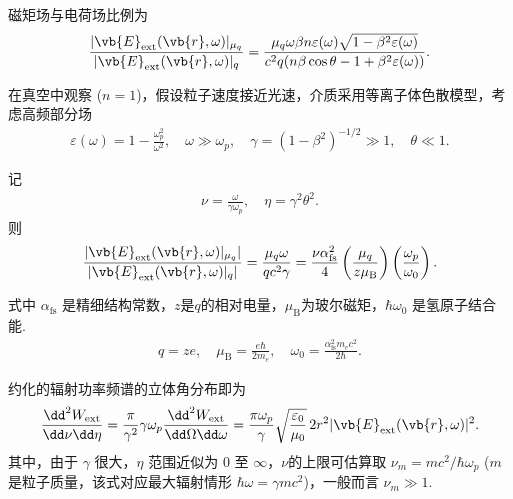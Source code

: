 磁矩场与电荷场比例为
\begin{align*}
	\frac{|\vb{E}_{\mathrm{ext}}(\vb{r}, \omega)|_{\mu_{q}}}{|\vb{E}_{\mathrm{ext}}(\vb{r}, \omega)|_{q}} = \frac{\mu_{q} \omega \beta n \varepsilon(\omega) \sqrt{1 - \beta^{2} \varepsilon(\omega)}}{c^{2} q (n \beta \cos\theta - 1 + \beta^{2} \varepsilon(\omega))}.
\end{align*}

在真空中观察 (\(n = 1\))，假设粒子速度接近光速，介质采用等离子体色散模型，考虑高频部分场
\begin{align*}
	\varepsilon(\omega) = 1 - \frac{\omega_{p}^{2}}{\omega^{2}}, \quad \omega \gg \omega_{p}, \quad
	\gamma = (1 - \beta^{2})^{-1/2} \gg 1, \quad \theta \ll 1.
\end{align*}

记
\begin{align*}
	\nu = \frac{\omega}{\gamma \omega_{p}}, \quad \eta = \gamma^{2} \theta^{2}.
\end{align*}
则
\begin{align*}
	\frac{|\vb{E}_{\mathrm{ext}}(\vb{r}, \omega)|_{\mu_{q}}|}{|\vb{E}_{\mathrm{ext}}(\vb{r}, \omega)|_{q}|} = \frac{\mu_{q} \omega}{q c^{2} \gamma} = \frac{\nu \alpha_{\mathrm{fs}}^{2}}{4} \left( \frac{\mu_{q}}{z \mu_{\mathrm{B}}} \right) \left( \frac{\omega_{p}}{\omega_{0}} \right).
\end{align*}

式中 \(\alpha_{\mathrm{fs}}\) 是精细结构常数，\(z\)是\(q\)的相对电量，\(\mu_{\mathrm{B}}\)为玻尔磁矩，\(\hbar\omega_{0}\) 是氢原子结合能.
\begin{align*}
	q = z e, \quad \mu_{\mathrm{B}} = \frac{e\hbar}{2 m_{e}}, \quad \omega_{0} = \frac{\alpha_{\mathrm{fs}}^{2} m_{e} c^{2}}{2\hbar}.
\end{align*}

约化的辐射功率频谱的立体角分布即为
\begin{align*}
	\frac{\dd^{2} W_{\mathrm{ext}}}{\dd \nu \dd \eta} = \frac{\pi}{\gamma^{2}} \gamma \omega_{p} \frac{\dd^{2} W_{\mathrm{ext}}}{\dd \Omega \dd \omega} = \frac{\pi \omega_{p}}{\gamma} \sqrt{\frac{\varepsilon_{0}}{\mu_{0}}} \, 2 r^{2} | \vb{E}_{\mathrm{ext}}(\vb{r}, \omega) |^{2}.
\end{align*}
其中，由于 \(\gamma\) 很大，\(\eta\) 范围近似为 \(0\) 至 \(\infty\)，\(\nu\)的上限可估算取 \(\nu_{m} =m c^{2}/\hbar \omega_{p}\) (\(m\) 是粒子质量，该式对应最大辐射情形 \(\hbar\omega = \gamma m c^{2}\))，一般而言 \(\nu_{m} \gg 1\).

